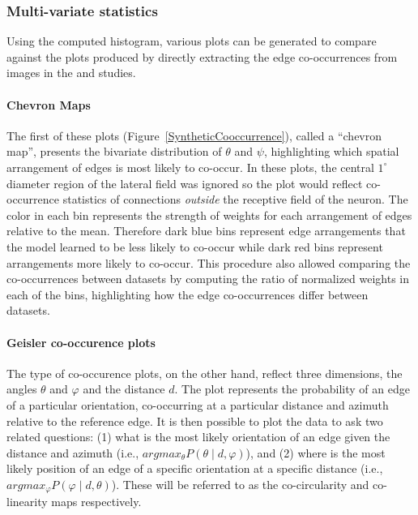 \subsubsection*{Multi-variate statistics}

Using the computed histogram, various plots can be generated to
compare against the plots produced by directly extracting the edge
co-occurrences from images in the \cite{Perrinet2015} and
\cite{Geisler2001} studies.

\paragraph{Chevron Maps}

The first of these plots (Figure~\ref{SyntheticCooccurrence}), called
a ``chevron map'', presents the bivariate distribution of $\theta$ and
$\psi$, highlighting which spatial arrangement of edges is most likely
to co-occur. In these plots, the central $1^\circ$ diameter region of
the lateral field was ignored so the plot would reflect co-occurrence
statistics of connections \emph{outside} the receptive field of the
neuron. The color in each bin represents the strength of weights for
each arrangement of edges relative to the mean. Therefore dark blue
bins represent edge arrangements that the model learned to be less
likely to co-occur while dark red bins represent arrangements more
likely to co-occur. This procedure also allowed comparing the
co-occurrences between datasets by computing the ratio of normalized
weights in each of the bins, highlighting how the edge co-occurrences
differ between datasets.

\paragraph{Geisler co-occurence plots}

The \cite{Geisler2001} type of co-occurence plots, on the other hand,
reflect three dimensions, the angles $\theta$ and $\varphi$ and the
distance $d$. The plot represents the probability of an edge of a
particular orientation, co-occurring at a particular distance and
azimuth relative to the reference edge. It is then possible to plot
the data to ask two related questions: (1) what is the most likely
orientation of an edge given the distance and azimuth (i.e.,
$argmax_\theta P(\theta \mid d, \varphi)$), and (2) where is the most
likely position of an edge of a specific orientation at a specific
distance (i.e., $argmax_\varphi P(\varphi \mid d, \theta)$). These
will be referred to as the co-circularity and co-linearity maps
respectively.

